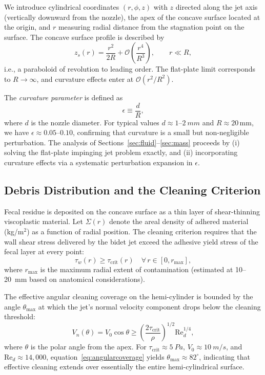 \documentclass[aps,prfluids,reprint,amsmath,amssymb,floatfix]{revtex4-2}
\newcommand{\Rey}{\mathrm{Re}}
\begin{document}
We introduce cylindrical coordinates $(r, \phi, z)$ with $z$ directed along
the jet axis (vertically downward from the nozzle), the apex of the concave
surface located at the origin, and $r$ measuring radial distance from the
stagnation point on the surface. The concave surface profile is described by
\begin{equation}
    z_s(r) = \frac{r^2}{2R} + \mathcal{O}\!\left(\frac{r^4}{R^3}\right),
    \qquad r \ll R,
    \label{eq:surfaceprofile}
\end{equation}
i.e., a paraboloid of revolution to leading order. The flat-plate limit
corresponds to $R \to \infty$, and curvature effects enter at
$\mathcal{O}(r^2/R^2)$.

The \emph{curvature parameter} is defined as
\begin{equation}
    \epsilon \equiv \frac{d}{R},
    \label{eq:curvparam}
\end{equation}
where $d$ is the nozzle diameter. For typical values $d \approx 1$--$\SI{2}{mm}$
and $R \approx 20\,\mathrm{mm}$, we have $\epsilon \approx 0.05$--$0.10$,
confirming that curvature is a small but non-negligible perturbation. The
analysis of Sections~\ref{sec:fluid}--\ref{sec:mass} proceeds by (i)
solving the flat-plate impinging jet problem exactly, and (ii) incorporating
curvature effects via a systematic perturbation expansion in $\epsilon$.

\subsection{Debris Distribution and the Cleaning Criterion}

Fecal residue is deposited on the concave surface as a thin layer of
shear-thinning viscoplastic material. Let $\Sigma(r)$ denote the areal
density of adhered material (kg/m$^2$) as a function of radial position.
The cleaning criterion requires that the wall shear stress delivered by the
bidet jet exceed the adhesive yield stress of the fecal layer at every point:
\begin{equation}
    \tau_w(r) \geq \tau_\mathrm{crit}(r) \quad \forall\, r \in [0, r_\mathrm{max}],
    \label{eq:cleaningcriterion}
\end{equation}
where $r_\mathrm{max}$ is the maximum radial extent of contamination (estimated
at 10--\SI{20}{mm} based on anatomical considerations).

The effective angular cleaning coverage on the hemi-cylinder is bounded by
the angle $\theta_\mathrm{max}$ at which the jet's normal velocity component
drops below the cleaning threshold:
\begin{equation}
    V_n(\theta) = V_0 \cos\theta \geq
    \left(\frac{2\tau_\mathrm{crit}}{\rho}\right)^{1/2} \Rey_d^{1/4},
    \label{eq:angularcoverage}
\end{equation}
where $\theta$ is the polar angle from the apex. For $\tau_\mathrm{crit} \approx
\SI{5}{Pa}$, $V_0 \approx \SI{10}{m/s}$, and $\Rey_d \approx 14{,}000$,
equation~\eqref{eq:angularcoverage} yields $\theta_\mathrm{max} \approx 82^\circ$,
indicating that effective cleaning extends over essentially the entire
hemi-cylindrical surface.
\end{document}
